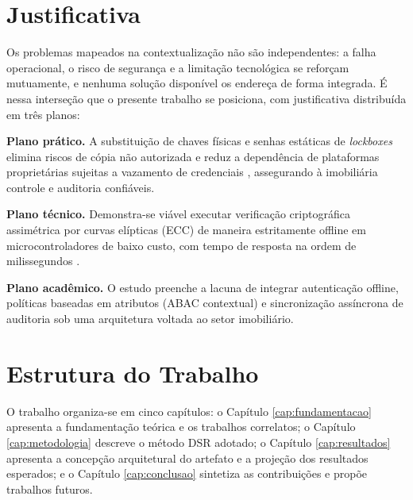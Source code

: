 \section{Justificativa}
\label{sec:justificativa}

Os problemas mapeados na contextualização não são independentes: a falha operacional, o risco de segurança e a limitação tecnológica se reforçam mutuamente, e nenhuma solução disponível os endereça de forma integrada. É nessa interseção que o presente trabalho se posiciona, com justificativa distribuída em três planos:

\textbf{Plano prático.} A substituição de chaves físicas e senhas estáticas de \textit{lockboxes} elimina riscos de cópia não autorizada \cite{satanasaowapak2021} e reduz a dependência de plataformas proprietárias sujeitas a vazamento de credenciais \cite{camargosilvablockchain2023}, assegurando à imobiliária controle e auditoria confiáveis.

\textbf{Plano técnico.} Demonstra-se viável executar verificação criptográfica assimétrica por curvas elípticas (ECC) de maneira estritamente offline em microcontroladores de baixo custo, com tempo de resposta na ordem de milissegundos \cite{hanblockchainoffline2018,hanotmpp2l2020}.

\textbf{Plano acadêmico.} O estudo preenche a lacuna de integrar autenticação offline, políticas baseadas em atributos (ABAC contextual) e sincronização assíncrona de auditoria sob uma arquitetura voltada ao setor imobiliário.

\section{Estrutura do Trabalho}
\label{sec:estrutura}

O trabalho organiza-se em cinco capítulos: o Capítulo \ref{cap:fundamentacao} apresenta a fundamentação teórica e os trabalhos correlatos; o Capítulo \ref{cap:metodologia} descreve o método DSR adotado; o Capítulo \ref{cap:resultados} apresenta a concepção arquitetural do artefato e a projeção dos resultados esperados; e o Capítulo \ref{cap:conclusao} sintetiza as contribuições e propõe trabalhos futuros.
